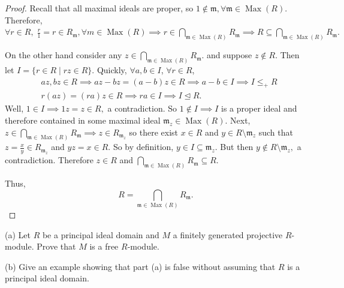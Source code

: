\documentclass[addpoints,10pt]{exam}
\theoremstyle{plain}
\theoremstyle{definition}
\newtheorem{prob}[thm]{Problem}
\theoremstyle{plain}
\theoremstyle{plain}
\theoremstyle{definition}
\let\oldprob\prob
\let\endoldprob\endprob
\renewenvironment{prob}
  {\begin{singlespace}\oldprob}
  {\endoldprob\end{singlespace}}
\begin{document}
\begin{proof}
Recall that all maximal ideals are proper, so $1\notin \mathfrak{m},\forall \mathfrak{m}\in \operatorname{Max}(R).$ Therefore, $\forall r\in R,\;\frac{r}{1}=r\in R_{\mathfrak{m}},\forall m\in \operatorname{Max}(R)\implies r\in \bigcap_{\mathfrak{m}\in \operatorname{Max}(R)} R_{\mathfrak{m}}\implies R\subseteq \bigcap_{\mathfrak{m}\in \operatorname{Max}(R)} R_{\mathfrak{m}}.$ 

On the other hand consider any $z\in \bigcap_{\mathfrak{m}\in \operatorname{Max}(R)}R_{\mathfrak{m}}.$
and suppose $z\notin R$. Then let $I=\{r\in R\mid rz\in R\}.$ Quickly, $\forall a,b\in I$, $\forall r\in R$,
\begin{align*}
&az,bz\in R\implies az-bz=(a-b)z\in R\implies a-b\in I\implies I\leq_{+}R\\
&r(az)=(ra)z\in R\implies ra\in I\implies I\trianglelefteq R.
\end{align*}
Well, $1\in I\implies 1z=z\in R,$ a contradiction. So $1\notin I\implies I$ is a proper ideal and therefore contained in some maximal ideal $\mathfrak{m}_{z}\in \operatorname{Max}(R).$ Next, $z\in \bigcap_{\mathfrak{m}\in \operatorname{Max}(R)}R_{\mathfrak{m}}\implies z\in R_{\mathfrak{m}_{z}}$ so there exist $x\in R$ and $y\in R\setminus \mathfrak{m}_{z}$ such that $z=\frac{x}{y}\in R_{\mathfrak{m}_{z}}$ and $yz=x\in R.$ So by definition, $y\in I\subseteq \mathfrak{m}_{z}$. But then $y\notin R\setminus \mathfrak{m}_{z},$ a contradiction. Therefore $z\in R$ and $\bigcap_{\mathfrak{m}\in \operatorname{Max}(R)} R_{\mathfrak{m}}\subseteq R$.

Thus,
$$R=\bigcap_{\mathfrak{m}\in \operatorname{Max}(R)} R_{\mathfrak{m}}.$$
\end{proof}
\newpage
\begin{prob}
(a) Let $R$ be a principal ideal domain and $M$ a finitely generated projective $R$-module. Prove that $M$ is a free $R$-module.

(b) Give an example showing that part (a) is false without assuming that $R$ is a principal ideal domain.
\end{prob}
\end{document}

